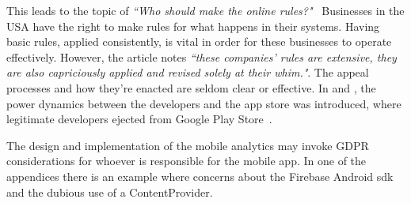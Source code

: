 This leads to the topic of \emph{``Who should make the online rules?"}~ 
Businesses in the USA have the right to make rules for what happens in their systems. Having basic rules, applied consistently, is vital in order for these businesses to operate effectively. However, the article notes \emph{``these companies’ rules are extensive, they are also capriciously applied and revised solely at their whim."}. The appeal processes and how they're enacted are seldom clear or effective. In  and , the power dynamics between the developers and the app store was introduced, where legitimate developers ejected from Google Play Store~. %

The design and implementation of the mobile analytics may invoke GDPR considerations for whoever is responsible for the mobile app. In one of the appendices there is an example where concerns about the Firebase Android \Gls{sdk} and the dubious use of a ContentProvider.

